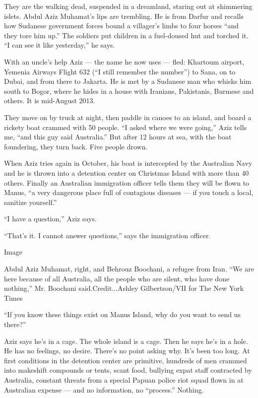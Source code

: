 They are the walking dead, suspended in a dreamland, staring out at
shimmering islets. Abdul Aziz Muhamat's lips are trembling. He is from
Darfur and recalls how Sudanese government forces bound a villager's
limbs to four horses ``and they tore him up.'' The soldiers put children
in a fuel-doused hut and torched it. ``I can see it like yesterday,'' he
says.

With an uncle's help Aziz --- the name he now uses --- fled: Khartoum
airport, Yemenia Airways Flight 632 (``I still remember the number'') to
Sana, on to Dubai, and from there to Jakarta. He is met by a Sudanese
man who whisks him south to Bogor, where he hides in a house with
Iranians, Pakistanis, Burmese and others. It is mid-August 2013.

They move on by truck at night, then paddle in canoes to an island, and
board a rickety boat crammed with 50 people. ``I asked where we were
going,'' Aziz tells me, ``and this guy said Australia.'' But after 12
hours at sea, with the boat foundering, they turn back. Five people
drown.

When Aziz tries again in October, his boat is intercepted by the
Australian Navy and he is thrown into a detention center on Christmas
Island with more than 40 others. Finally an Australian immigration
officer tells them they will be flown to Manus, ``a very dangerous place
full of contagious diseases --- if you touch a local, sanitize
yourself.''

``I have a question,'' Aziz says.

``That's it. I cannot answer questions,'' says the immigration officer.

Image

Abdul Aziz Muhamat, right, and Behrouz Boochani, a refugee from Iran.
``We are here because of all Australia, all the people who are silent,
who have done nothing,'' Mr. Boochani said.Credit...Ashley
Gilbertson/VII for The New York Times

``If you know these things exist on Manus Island, why do you want to
send us there?''

Aziz says he's in a cage. The whole island is a cage. Then he says he's
in a hole. He has no feelings, no desire. There's no point asking why.
It's been too long. At first conditions in the detention center are
primitive, hundreds of men crammed into makeshift compounds or tents,
scant food, bullying expat staff contracted by Australia, constant
threats from a special Papuan police riot squad flown in at Australian
expense --- and no information, no ``process.'' Nothing.

